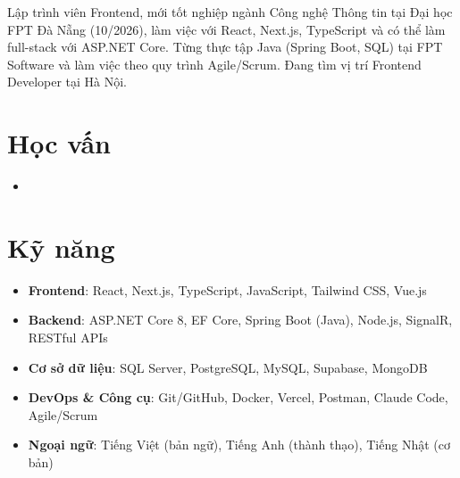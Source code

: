 \documentclass[10pt,a4paper,sans]{moderncv}
\begin{document}
\makecvtitle
\vspace{-22pt}

\small{Lập trình viên Frontend, mới tốt nghiệp ngành Công nghệ Thông tin tại Đại học FPT Đà Nẵng (10/2026), làm việc với React, Next.js, TypeScript và có thể làm full-stack với ASP.NET Core. Từng thực tập Java (Spring Boot, SQL) tại FPT Software và làm việc theo quy trình Agile/Scrum. Đang tìm vị trí Frontend Developer tại Hà Nội.}

\vspace{-4pt}
\section{Học vấn}
\vspace{1pt}
\begin{itemize}
\item{}
\end{itemize}

\vspace{-4pt}
\section{Kỹ năng}
\vspace{1pt}
\begin{itemize}
\item \textbf{Frontend}: React, Next.js, TypeScript, JavaScript, Tailwind CSS, Vue.js
\item \textbf{Backend}: ASP.NET Core 8, EF Core, Spring Boot (Java), Node.js, SignalR, RESTful APIs
\item \textbf{Cơ sở dữ liệu}: SQL Server, PostgreSQL, MySQL, Supabase, MongoDB
\item \textbf{DevOps \& Công cụ}: Git/GitHub, Docker, Vercel, Postman, Claude Code, Agile/Scrum
\item \textbf{Ngoại ngữ}: Tiếng Việt (bản ngữ), Tiếng Anh (thành thạo), Tiếng Nhật (cơ bản)
\end{itemize}
\end{document}
